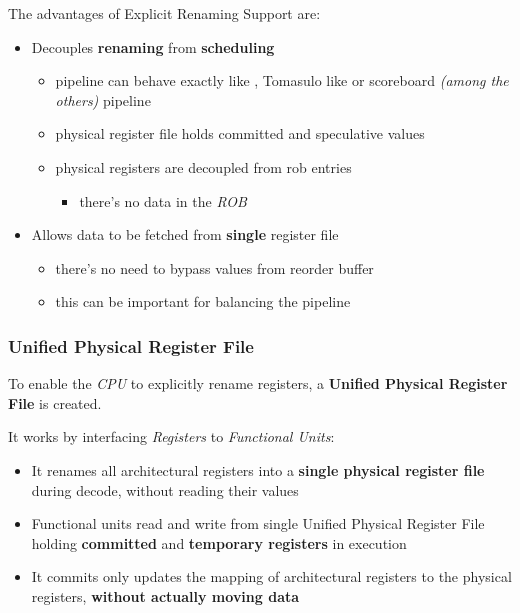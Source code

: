 \documentclass[english]{article}
\begin{document}
The advantages of Explicit Renaming Support are:

\begin{itemize}
  \item Decouples \textbf{renaming} from \textbf{scheduling}
        \begin{itemize}
          \item pipeline can behave exactly like , Tomasulo like or scoreboard \textit{(among the others)} pipeline
          \item physical register file holds committed and speculative values
          \item physical registers are decoupled from rob entries
                \begin{itemize}
                  \item there's no data in the \textit{ROB}
                \end{itemize}
        \end{itemize}
  \item Allows data to be fetched from \textbf{single} register file
        \begin{itemize}
          \item there's no need to bypass values from reorder buffer
          \item this can be important for balancing the pipeline
        \end{itemize}
\end{itemize}

\subsubsection{Unified Physical Register File}

To enable the \textit{CPU} to explicitly rename registers, a \textbf{Unified Physical Register File} is created.

It works by interfacing \textit{Registers} to \textit{Functional Units}:

\begin{itemize}
  \item It renames all architectural registers into a \textbf{single physical register file} during decode, without reading their values
  \item Functional units read and write from single Unified Physical Register File holding \textbf{committed} and \textbf{temporary registers} in execution
  \item It commits only updates the mapping of architectural registers to the physical registers, \textbf{without actually moving data}
\end{itemize}
\end{document}
